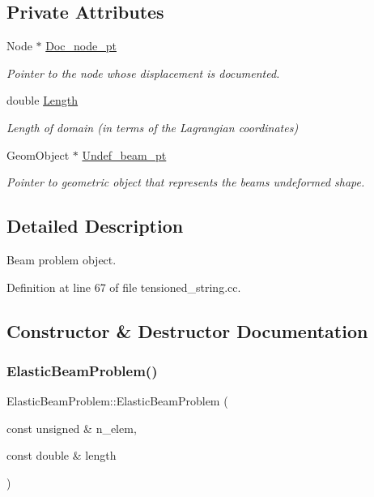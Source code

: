 \subsection*{Private Attributes}
\begin{DoxyCompactItemize}
\item 
Node $\ast$ \hyperlink{classElasticBeamProblem_a9c96cab7e71243e51f7c4040a84cdd5d}{Doc\+\_\+node\+\_\+pt}
\begin{DoxyCompactList}\small\item\em Pointer to the node whose displacement is documented. \end{DoxyCompactList}\item 
double \hyperlink{classElasticBeamProblem_aa68b1c77e0aa1571fe956d62bd8cf096}{Length}
\begin{DoxyCompactList}\small\item\em Length of domain (in terms of the Lagrangian coordinates) \end{DoxyCompactList}\item 
Geom\+Object $\ast$ \hyperlink{classElasticBeamProblem_a134a789cae77ab61a3e32bd93b28e1fa}{Undef\+\_\+beam\+\_\+pt}
\begin{DoxyCompactList}\small\item\em Pointer to geometric object that represents the beam\textquotesingle{}s undeformed shape. \end{DoxyCompactList}\end{DoxyCompactItemize}


\subsection{Detailed Description}
Beam problem object. 

Definition at line 67 of file tensioned\+\_\+string.\+cc.



\subsection{Constructor \& Destructor Documentation}
\mbox{\label{classElasticBeamProblem_a1c62c2a14c9a5528a649700d16dac2ea}} 
\subsubsection{\texorpdfstring{Elastic\+Beam\+Problem()}{ElasticBeamProblem()}}
{\footnotesize\ttfamily Elastic\+Beam\+Problem\+::\+Elastic\+Beam\+Problem (\begin{DoxyParamCaption}\item[{const unsigned \&}]{n\+\_\+elem,  }\item[{const double \&}]{length }\end{DoxyParamCaption})}



